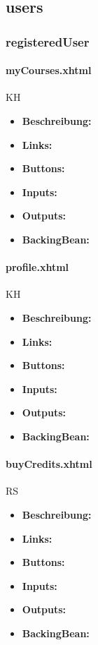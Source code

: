 		\subsection{users}
		
			\subsubsection{registeredUser}
				
				\paragraph{myCourses.xhtml}
					KH\\
					\begin{itemize}
						\item \textbf{Beschreibung:}
						\item \textbf{Links:}
						\item \textbf{Buttons:}
						\item \textbf{Inputs:}
						\item \textbf{Outputs:}
						\item \textbf{BackingBean:}
					\end{itemize}
				
				\paragraph{profile.xhtml}
					KH\\
					\begin{itemize}
						\item \textbf{Beschreibung:}
						\item \textbf{Links:}
						\item \textbf{Buttons:}
						\item \textbf{Inputs:}
						\item \textbf{Outputs:}
						\item \textbf{BackingBean:}
					\end{itemize}
				
				\paragraph{buyCredits.xhtml}
					RS\\
					\begin{itemize}
						\item \textbf{Beschreibung:}
						\item \textbf{Links:}
						\item \textbf{Buttons:}
						\item \textbf{Inputs:}
						\item \textbf{Outputs:}
						\item \textbf{BackingBean:}
					\end{itemize}
				
